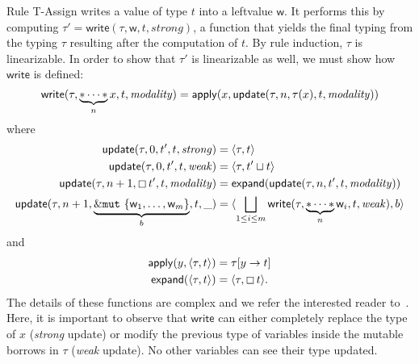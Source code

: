 Rule \textsf{T-Assign} writes a value of type $t$ into a leftvalue $\mathsf{w}$.
It performs this by computing $\tau'=\mathsf{write}(\tau,\mathsf{w},t,\mathit{strong})$,
a function that yields the final typing from the typing $\tau$ resulting after the computation of $t$.
By rule induction, $\tau$ is linearizable. In order to show that $\tau'$ is linearizable as well,
we must show how $\mathsf{write}$ is defined:
\[
\mathsf{write}(\tau,\underbrace{\mathtt{*}\cdots\mathtt{*}}_nx,t,\mathit{modality})=\mathsf{apply}
(x,\mathsf{update}(\tau,n,\tau(x),t,\mathit{modality}))
\]
where
\begin{align*}
  \mathsf{update}(\tau,0,t',t,\mathit{strong})&=\langle\tau,t\rangle\\
  \mathsf{update}(\tau,0,t',t,\mathit{weak})&=\langle\tau,t'\sqcup t\rangle\\
  \mathsf{update}(\tau,n+1,\boxempty\,{t'},t,\mathit{modality})
  &=\mathsf{expand}(\mathsf{update}(\tau,n,t',t,\mathit{modality}))\\
  \mathsf{update}(\tau,n+1,\underbrace{\&\mathtt{mut}\ \{\mathsf{w}_1,\ldots,\mathsf{w}_m\}}_b,t,\_)&=
    \langle\bigsqcup\limits_{1\le i\le m}\mathsf{write}(\tau,\underbrace{\mathtt{*}\cdots\mathtt{*}}_n\mathsf{w}_i,t,\mathit{weak}),b\rangle
\end{align*}
and
\begin{align*}
  \mathsf{apply}(y,\langle\tau,t\rangle)&=\tau[y\to t]\\
  \mathsf{expand}(\langle\tau,t\rangle)&=\langle\tau,\boxempty\,{t}\rangle.
\end{align*}
%
The details of these functions
are complex and we refer the interested reader to~\cite{Pearce21}.
Here, it is important to observe that $\mathsf{write}$
can either completely replace the type of $x$
(\emph{strong} update) or modify the previous type of variables
inside the mutable borrows in $\tau$ (\emph{weak} update).
No other variables can see their type updated.

